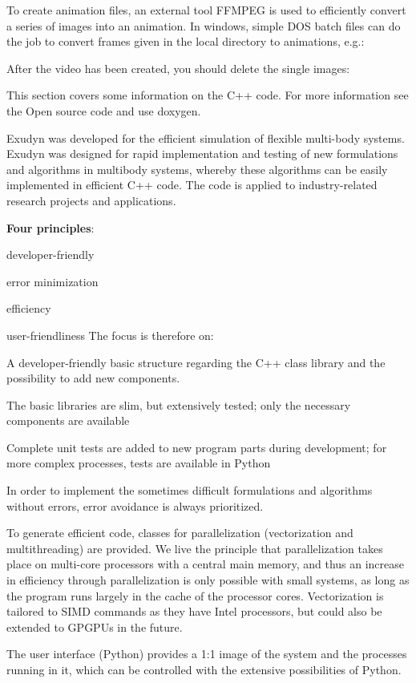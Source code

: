 To create animation files, an external tool FFMPEG is used to efficiently convert a series of images into an animation.
In windows, simple DOS batch files can do the job to convert frames given in the local directory to animations, e.g.:
\plainlststyle

After the video has been created, you should delete the single images:
\plainlststyle




This section covers some information on the C++ code. For more information see the Open source code and use doxygen.

Exudyn was developed for the efficient simulation of flexible multi-body systems. Exudyn was designed for rapid implementation and testing of new formulations and algorithms in multibody systems, whereby these algorithms can be easily implemented in efficient C++ code. The code is applied to industry-related research projects and applications.

{\bf Four principles}: 
\bn
  \item developer-friendly
	\item error minimization
	\item efficiency
	\item user-friendliness
\en
The focus is therefore on:
\bi
    \item A developer-friendly basic structure regarding the C++ class library and the possibility to add new components.
    \item The basic libraries are slim, but extensively tested; only the necessary components are available
    \item Complete unit tests are added to new program parts during development; for more complex processes, tests are available in Python
    \item In order to implement the sometimes difficult formulations and algorithms without errors, error avoidance is always prioritized.
    \item To generate efficient code, classes for parallelization (vectorization and multithreading) are provided. We live the principle that parallelization takes place on multi-core processors with a central main memory, and thus an increase in efficiency through parallelization is only possible with small systems, as long as the program runs largely in the cache of the processor cores. Vectorization is tailored to SIMD commands as they have Intel processors, but could also be extended to GPGPUs in the future.
    \item The user interface (Python) provides a 1:1 image of the system and the processes running in it, which can be controlled with the extensive possibilities of Python.
\ei

